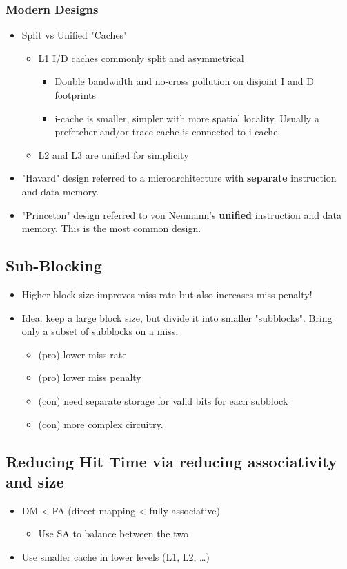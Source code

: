 \documentclass[10pt]{article}
\begin{document}
\subsubsection*{Modern Designs}
\begin{itemize}
    \item Split vs Unified "Caches"
    \begin{itemize}
        \item L1 I/D caches commonly split and asymmetrical
        \begin{itemize}
            \item Double bandwidth and no-cross pollution on disjoint I and D footprints
            \item i-cache is smaller, simpler with more spatial locality.  Usually a prefetcher and/or trace cache is connected to i-cache.
        \end{itemize}
        \item L2 and L3 are unified for simplicity
    \end{itemize}
    \item "Havard" design referred to a microarchitecture with \textbf{separate} instruction and data memory.
    \item "Princeton" design referred to von Neumann's \textbf{unified} instruction and data memory.  This is the most common design.
\end{itemize}

\subsection*{Sub-Blocking}
\begin{itemize}
    \item Higher block size improves miss rate but also increases miss penalty!
    \item Idea: keep a large block size, but divide it into smaller "subblocks".  Bring only a subset of subblocks on a miss.
    \begin{itemize}
        \item (pro) lower miss rate
        \item (pro) lower miss penalty
        \item (con) need separate storage for valid bits for each subblock
        \item (con) more complex circuitry.
    \end{itemize}
\end{itemize}


\subsection*{Reducing Hit Time via reducing associativity and size}
\begin{itemize}
    \item DM < FA (direct mapping < fully associative)
    \begin{itemize}
        \item Use SA to balance between the two
    \end{itemize}
    \item Use smaller cache in lower levels (L1, L2, \dots)
\end{itemize}
\end{document}
